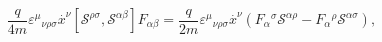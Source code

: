 \begin{equation}
\frac{q}{4m}\varepsilon ^{\mu }{}_{\nu \rho \sigma }\stackrel{.}{x}%
^{\nu }\left[ \mathcal{S}^{\rho \sigma },\mathcal{S}^{\alpha \beta }\right]
F_{\alpha \beta }=\frac{q}{2m}\varepsilon ^{\mu }{}_{\nu \rho \sigma }
\stackrel{.}{x}^{\nu }\left( F_{\alpha }{}^{\sigma }\mathcal{S}^{\alpha
\rho }-F_{\alpha }{}^{\rho }\mathcal{S}^{\alpha \sigma }\right) ,
\end{equation}

